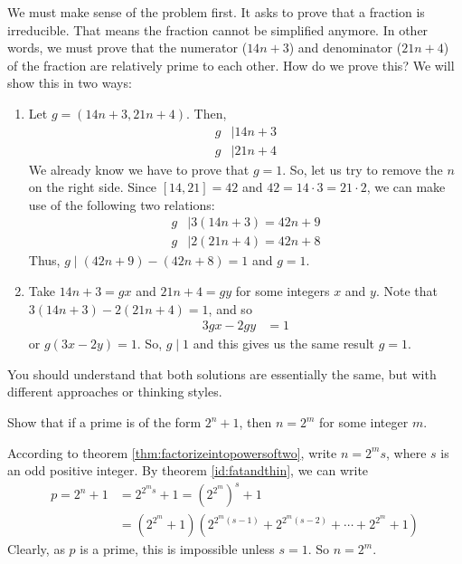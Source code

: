 \documentclass{subfile}
\begin{document}
	\begin{solution}
		We must make sense of the problem first. It asks to prove that a fraction is irreducible. That means the fraction cannot be simplified anymore. In other words, we must prove that the numerator ($14n+3$) and denominator ($21n+4$) of the fraction are relatively prime to each other. How do we prove this? We will show this in two ways:
		\begin{enumerate}
			\item Let $g=(14n+3,21n+4)$. Then,
			\begin{align*}
				g & \mid 14n+3\\
				g & \mid 21n+4
			\end{align*}
		We already know we have to prove that $g=1$. So, let us try to remove the $n$ on the right side. Since $[14,21]=42$ and $42=14\cdot3=21\cdot2$, we can make use of the following two relations:
			\begin{align*}
				g & \mid 3(14n+3) = 42n+9\\
				g & \mid  2(21n+4)= 42n+8
			\end{align*}
		Thus, $g\mid (42n+9)-(42n+8)=1$ and $g=1$.

			\item Take $14n+3=gx$ and $21n+4=gy$ for some integers $x$ and $y$. Note that $3(14n+3)-2(21n+4) = 1$, and so
			\begin{align*}
				 3gx-2gy  & = 1
			\end{align*}
		or $g(3x-2y) = 1.$ So, $g\mid 1$ and this gives us the same result $g=1$.
		\end{enumerate}
	\end{solution}

	\begin{remark}
		You should understand that both solutions are essentially the same, but with different approaches or thinking styles.
	\end{remark}

	\begin{problem}\label{prob:prime=poweroftwoplusone}
		Show that if a prime is of the form $2^n+1$, then $n=2^m$ for some integer $m$.
	\end{problem}

	\begin{solution}
		According to theorem \autoref{thm:factorizeintopowersoftwo}, write $n=2^ms$, where $s$ is an odd positive integer. By theorem \eqref{id:fatandthin}, we can write
			\begin{align*}
				p = 2^n+1 &= 2^{2^{m}s}+1 = \left(2^{2^{m}}\right)^s+1\\
				   		  &=\left(2^{2^m}+1\right)\left(2^{2^{m}(s-1)}+2^{2^{m}(s-2)}+ \cdots + 2^{2^{m}}+1\right)
			\end{align*}
		Clearly, as $p$ is a prime, this is impossible unless $s=1$. So $n=2^m$.
	\end{solution}
\end{document}
